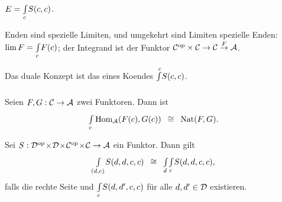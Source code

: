 \documentclass{cheat-sheet}
\newenvironment{centertikzcd}
  {\begin{center}\begin{tikzcd}}
  {\end{tikzcd}\end{center}}
\begin{document}






\begin{nota}
  $E = {\textstyle \int\limits_{c}^{}} S(c,c)$.
\end{nota}

\begin{bem}
  Enden sind spezielle Limiten, und umgekehrt sind Limiten spezielle Enden: $\lim F = {\textstyle \int\limits_{c}^{}} F(c)$; der Integrand ist der Funktor $\mathcal{C}^{\mathrm{op}} \times \mathcal{C} \to \mathcal{C} \stackrel{F}{\to} \mathcal{A}$.
\end{bem}

\begin{bem}
  Das duale Konzept ist das eines  Koendes ${\textstyle \int\limits_{}^{c}} S(c, c)$.
\end{bem}

\begin{bsp}
  Seien $F, G : \mathcal{C} \to \mathcal{A}$ zwei Funktoren. Dann ist
  \[ {\textstyle \int\limits_{c}^{}} \operatorname{Hom}_{\mathcal{A}}(F(c), G(c)) \enspace\cong\enspace \operatorname{Nat}(F, G). \]
\end{bsp}

\begin{satz}[Fubini]
  Sei $S : \mathcal{D}^{\mathrm{op}} \!\times\! \mathcal{D} \!\times\! \mathcal{C}^{\mathrm{op}} \!\times\! \mathcal{C} \to \mathcal{A}$ ein Funktor. Dann gilt
  \[ {\textstyle \int\limits_{(d,c)}^{}} S(d,d,c,c) \enspace\cong\enspace {\textstyle \int\limits_{d}^{}} {\textstyle \int\limits_{c}^{}} S(d,d,c,c), \]
  falls die rechte Seite und ${\textstyle \int\limits_{c}^{}} S(d,d',c,c)$ für alle $d, d' \in \mathcal{D}$ existieren.
\end{satz}
\end{document}
